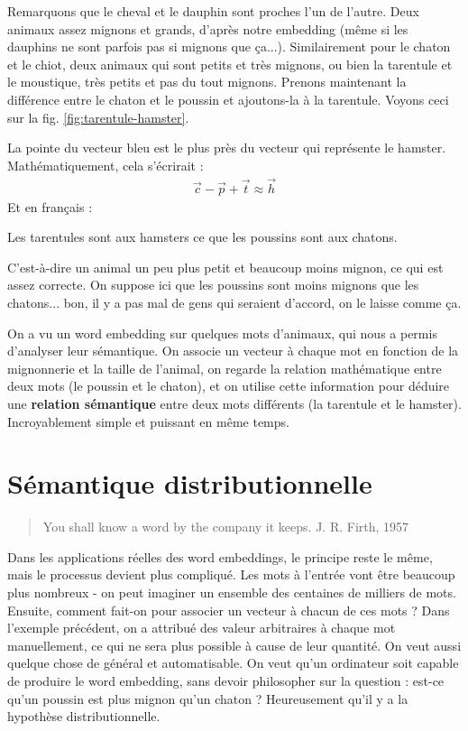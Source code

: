 \documentclass[11pt, a4paper]{report}
\begin{document}
Remarquons que le cheval et le dauphin sont proches l'un de l'autre. Deux animaux assez mignons et grands, 
d'après notre embedding (même si les dauphins ne sont parfois pas si mignons que ça...). Similairement pour 
le chaton et le chiot, deux animaux qui sont petits et très mignons, ou bien la tarentule et le moustique, 
très petits et pas du tout mignons. Prenons maintenant la différence entre le chaton et le poussin et ajoutons-la 
à la tarentule. Voyons ceci sur la fig. \ref{fig:tarentule-hamster}. 

La pointe du vecteur bleu est le plus près du vecteur qui représente le hamster.
Mathématiquement, cela s'écrirait :
\begin{align*}
  \vec{c} - \vec{p} + \vec{t} \approx \vec{h} 
\end{align*}
Et en français : 
\begin{center}
  Les tarentules sont aux hamsters ce que les poussins sont aux chatons. 
\end{center}
C'est-à-dire un animal un peu plus petit et beaucoup moins mignon, ce qui est assez 
correcte. On suppose ici que les poussins sont moins mignons que les chatons... bon, 
il y a pas mal de gens qui seraient d'accord, on le laisse comme ça. 

On a vu un word embedding sur quelques mots d'animaux, qui nous a permis d'analyser leur sémantique.  
On associe un vecteur à chaque mot en fonction de la mignonnerie et la 
taille de l'animal, on regarde la relation mathématique entre deux mots
(le poussin et le chaton), et on utilise cette information pour déduire une \textbf{relation sémantique} 
entre deux mots différents (la tarentule et le hamster). 
Incroyablement simple et puissant en même temps.


\section{Sémantique distributionnelle}
\begin{quote}
  You shall know a word by the company it keeps. \newline
  J. R. Firth, 1957
\end{quote}
\cite{wikipedia-distributional-semantics} 
\cite{firth-pic}
Dans les applications réelles des word embeddings, le principe reste le même, mais le processus devient plus 
compliqué. Les mots à l'entrée vont être beaucoup plus nombreux - on peut imaginer un ensemble 
des centaines de milliers de mots. Ensuite, comment fait-on pour associer un vecteur à chacun
de ces mots ? Dans l'exemple précédent, on a attribué des valeur arbitraires à chaque mot 
manuellement, ce qui ne sera plus possible à cause de leur quantité. On veut aussi quelque chose de général et 
automatisable. On veut qu'un ordinateur soit capable de produire le word embedding, sans devoir philosopher 
sur la question : est-ce qu'un poussin est plus mignon qu'un chaton ? Heureusement qu'il y a la 
hypothèse distributionnelle. 
\end{document}
